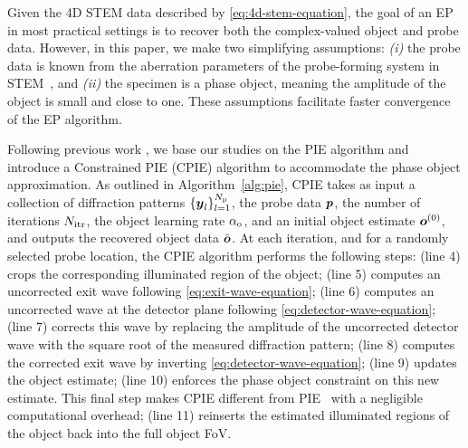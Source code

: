 \documentclass[11pt,draftclsnofoot,onecolumn]{IEEEtran}
\begin{document}
Given the 4D STEM data described by \eqref{eq:4d-stem-equation}, the goal of an EP in most practical settings is to recover both the complex-valued object and probe data. However, in this paper, we make two simplifying assumptions: \textit{(i)} the probe data is known from the aberration parameters of the probe-forming system in STEM~\cite{krivanek2017aberration}, and \textit{(ii)} the specimen is a phase object, meaning the amplitude of the object is small and close to one. These assumptions facilitate faster convergence of the EP algorithm.



Following previous work \cite{bunk2008influence}, we base our studies on the PIE algorithm \cite{rodenburg2004phase} and introduce a Constrained PIE (CPIE) algorithm to accommodate the phase object approximation.  As outlined in Algorithm~\ref{alg:pie}, CPIE takes as input a collection of diffraction patterns $\{\boldsymbol{y}_l\}_{l=1}^{N_{\rm p}}$, the probe data $\boldsymbol{p}$, the number of iterations $N_{\rm itr}$, the object learning rate $\alpha_{\rm o}$, and an initial object estimate $\boldsymbol{o}^{(0)}$, and outputs the recovered object data $\hat{\boldsymbol{o}}$. At each iteration, and for a randomly selected probe location, the CPIE algorithm performs the following steps: (line 4) crops the corresponding illuminated region of the object; (line 5) computes an uncorrected exit wave following \eqref{eq:exit-wave-equation}; (line 6) computes an uncorrected wave at the detector plane following \eqref{eq:detector-wave-equation}; (line 7) corrects this wave by replacing the amplitude of the uncorrected detector wave with the square root of the measured diffraction pattern; (line 8) computes the corrected exit wave by inverting \eqref{eq:detector-wave-equation}; (line 9) updates the object estimate; (line 10) enforces the phase object constraint on this new estimate. This final step makes CPIE different from PIE~\cite{rodenburg2004phase} with a negligible computational overhead; (line 11) reinserts the estimated illuminated regions of the object back into the full object FoV.
\end{document}

